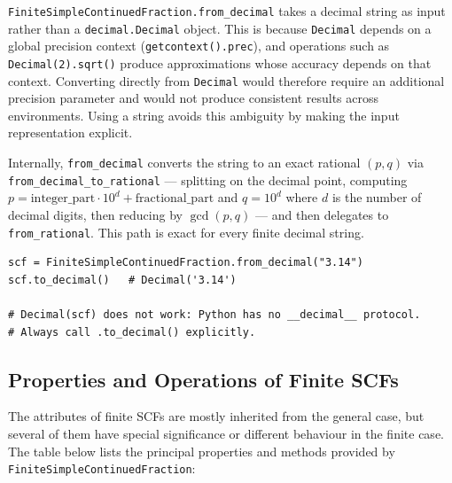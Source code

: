 \begin{remark}
  \texttt{FiniteSimpleContinuedFraction.from\_decimal} takes a decimal string as input rather than a
  \texttt{decimal.Decimal} object.  This is because \texttt{Decimal} depends on a global precision
  context (\texttt{getcontext().prec}), and operations such as \texttt{Decimal(2).sqrt()} produce
  approximations whose accuracy depends on that context.  Converting directly from \texttt{Decimal}
  would therefore require an additional precision parameter and would not produce consistent results
  across environments.  Using a string avoids this ambiguity by making the input representation
  explicit.

  Internally, \texttt{from\_decimal} converts the string to an exact rational $(p, q)$ via
  \texttt{from\_decimal\_to\_rational} — splitting on the decimal point, computing
  $p = \text{integer\_part} \cdot 10^d + \text{fractional\_part}$ and $q = 10^d$ where $d$ is the
  number of decimal digits, then reducing by $\gcd(p, q)$ — and then delegates to
  \texttt{from\_rational}.  This path is exact for every finite decimal string.
\end{remark}

\begin{catenadef}
\begin{lstlisting}[style=python]
scf = FiniteSimpleContinuedFraction.from_decimal("3.14")
scf.to_decimal()   # Decimal('3.14')

# Decimal(scf) does not work: Python has no __decimal__ protocol.
# Always call .to_decimal() explicitly.
\end{lstlisting}
\end{catenadef}


\subsection{Properties and Operations of Finite SCFs}

The attributes of finite SCFs are mostly inherited from the general case, but several of them
have special significance or different behaviour in the finite case.  The table below lists the
principal properties and methods provided by \texttt{FiniteSimpleContinuedFraction}:


